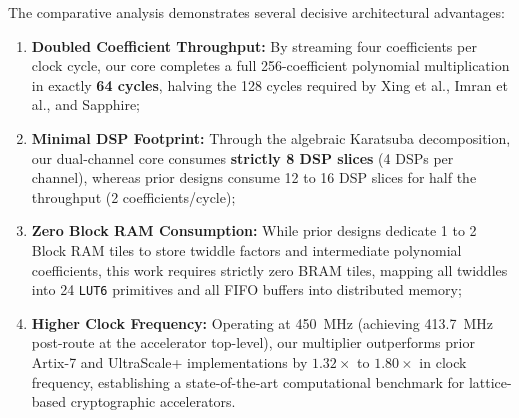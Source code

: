 The comparative analysis demonstrates several decisive architectural advantages:
\begin{enumerate}
    \item \textbf{Doubled Coefficient Throughput:} By streaming four coefficients per clock cycle, our core completes a full 256-coefficient polynomial multiplication in exactly \textbf{64 cycles}, halving the 128 cycles required by Xing et al., Imran et al., and Sapphire;
    \item \textbf{Minimal DSP Footprint:} Through the algebraic Karatsuba decomposition, our dual-channel core consumes \textbf{strictly 8 DSP slices} (4 DSPs per channel), whereas prior designs consume 12 to 16 DSP slices for half the throughput (2 coefficients/cycle);
    \item \textbf{Zero Block RAM Consumption:} While prior designs dedicate 1 to 2 Block RAM tiles to store twiddle factors and intermediate polynomial coefficients, this work requires strictly zero BRAM tiles, mapping all twiddles into 24 \texttt{LUT6} primitives and all FIFO buffers into distributed memory;
    \item \textbf{Higher Clock Frequency:} Operating at 450~MHz (achieving 413.7~MHz post-route at the accelerator top-level), our multiplier outperforms prior Artix-7 and UltraScale+ implementations by $1.32\times$ to $1.80\times$ in clock frequency, establishing a state-of-the-art computational benchmark for lattice-based cryptographic accelerators.
\end{enumerate}
